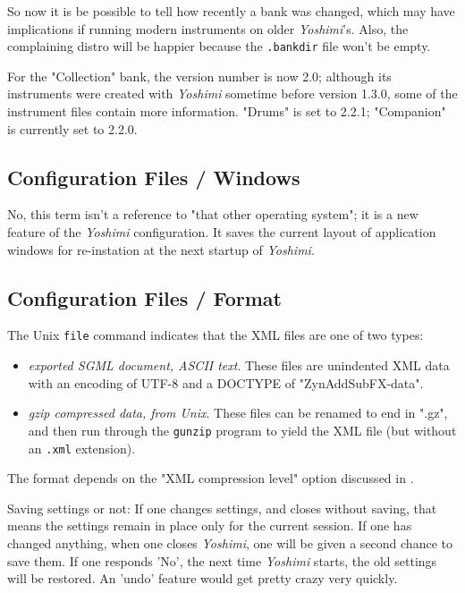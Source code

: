    So now it is be possible to tell how recently a bank was changed, which may
   have implications if running modern instruments on older \textsl{Yoshimi}'s.
   Also, the complaining distro will be happier because
   the \texttt{.bankdir} file won't be empty.

   For the "Collection" bank, the version number is now 2.0; although its
   instruments were created with \textsl{Yoshimi} sometime before version 1.3.0,
   some of the instrument files contain more information. "Drums" is set to 2.2.1;
   "Companion" is currently set to 2.2.0.

\subsection{Configuration Files / Windows}
\label{subsec:configuration_windows}

   No, this term isn't a reference to "that other operating system";
   it is a new feature of the \textsl{Yoshimi} configuration.
   It saves the current layout of application
   windows for re-instation at the next startup
   of \textsl{Yoshimi}.

\subsection{Configuration Files / Format}
\label{subsec:configuration_file_format}

   The Unix \texttt{file} command indicates that the XML files are one of
   two types:

   \begin{itemize}
      \item \textsl{exported SGML document, ASCII text}.
         These files are unindented XML data with an encoding of UTF-8 and
         a DOCTYPE of "ZynAddSubFX-data".
      \item \textsl{gzip compressed data, from Unix}.
         These files can be renamed to end in ".gz", and then run through
         the \texttt{gunzip} program to yield the XML file (but without an
         \texttt{.xml} extension).
   \end{itemize}

   The format depends on the "XML compression level" option discussed in
   .

   Saving settings or not:
   If one changes settings, and closes without saving, that means the settings
   remain in place only for the current session. If one has changed anything,
   when one closes \textsl{Yoshimi}, one will be given a second chance to
   save them. If one responds 'No',  the next time \textsl{Yoshimi} starts,
   the old settings will be restored.  An 'undo' feature would get pretty
   crazy very quickly.

